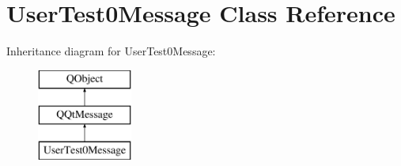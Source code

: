 \hypertarget{class_user_test0_message}{}\section{User\+Test0\+Message Class Reference}
\label{class_user_test0_message}
Inheritance diagram for User\+Test0\+Message\+:\begin{figure}[H]
\begin{center}
\leavevmode
\includegraphics[height=3.000000cm]{class_user_test0_message}
\end{center}
\end{figure}
